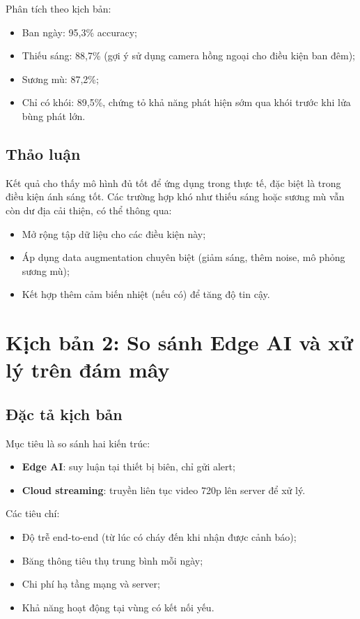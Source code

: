 \documentclass[12pt,a4paper]{report}
\begin{document}
Phân tích theo kịch bản:
\begin{itemize}
  \item Ban ngày: 95{,}3\% accuracy;
  \item Thiếu sáng: 88{,}7\% (gợi ý sử dụng camera hồng ngoại cho điều kiện ban đêm);
  \item Sương mù: 87{,}2\%;
  \item Chỉ có khói: 89{,}5\%, chứng tỏ khả năng phát hiện sớm qua khói trước khi lửa bùng phát lớn.
\end{itemize}

\subsection{Thảo luận}

Kết quả cho thấy mô hình đủ tốt để ứng dụng trong thực tế, đặc biệt là trong điều kiện ánh sáng tốt. Các trường hợp khó như thiếu sáng hoặc sương mù vẫn còn dư địa cải thiện, có thể thông qua:
\begin{itemize}
  \item Mở rộng tập dữ liệu cho các điều kiện này;
  \item Áp dụng data augmentation chuyên biệt (giảm sáng, thêm noise, mô phỏng sương mù);
  \item Kết hợp thêm cảm biến nhiệt (nếu có) để tăng độ tin cậy.
\end{itemize}

\section{Kịch bản 2: So sánh Edge AI và xử lý trên đám mây}

\subsection{Đặc tả kịch bản}

Mục tiêu là so sánh hai kiến trúc:
\begin{itemize}
  \item \textbf{Edge AI}: suy luận tại thiết bị biên, chỉ gửi alert;
  \item \textbf{Cloud streaming}: truyền liên tục video 720p lên server để xử lý.
\end{itemize}

Các tiêu chí:
\begin{itemize}
  \item Độ trễ end-to-end (từ lúc có cháy đến khi nhận được cảnh báo);
  \item Băng thông tiêu thụ trung bình mỗi ngày;
  \item Chi phí hạ tầng mạng và server;
  \item Khả năng hoạt động tại vùng có kết nối yếu.
\end{itemize}
\end{document}
